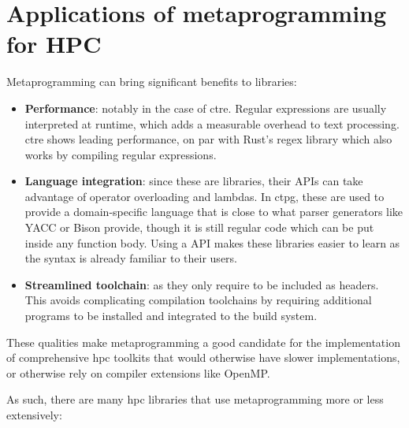 \documentclass[../main]{subfiles}
\begin{document}
\section{
  Applications of metaprogramming for HPC
}

Metaprogramming can bring significant benefits to libraries:

\begin{itemize}

  \item

\textbf{Performance}: notably in the case of \gls{ctre}.
Regular expressions are usually interpreted at runtime,
which adds a measurable overhead to text processing.
\gls{ctre} shows leading performance, on par with Rust's regex library
which also works by compiling regular expressions.

  \item

\textbf{Language integration}: since these are \cpp libraries,
their APIs can take advantage of \cpp operator overloading and lambdas.
In \gls{ctpg}, these are used to provide a domain-specific language that is close to
what parser generators like YACC or Bison provide,
though it is still regular \cpp code which can be put inside any function body.
Using a \cpp API makes these libraries easier to learn
as the syntax is already familiar to their users.

  \item

\textbf{Streamlined toolchain}: as they only require to be included as headers.
This avoids complicating compilation toolchains by requiring additional programs
to be installed and integrated to the build system.

\end{itemize}

These qualities make metaprogramming a good candidate for the implementation
of comprehensive \gls{hpc} toolkits that would otherwise have
slower implementations, or otherwise rely on compiler extensions like OpenMP.

As such, there are many \cpp \gls{hpc} libraries that use metaprogramming
more or less extensively:
\end{document}

